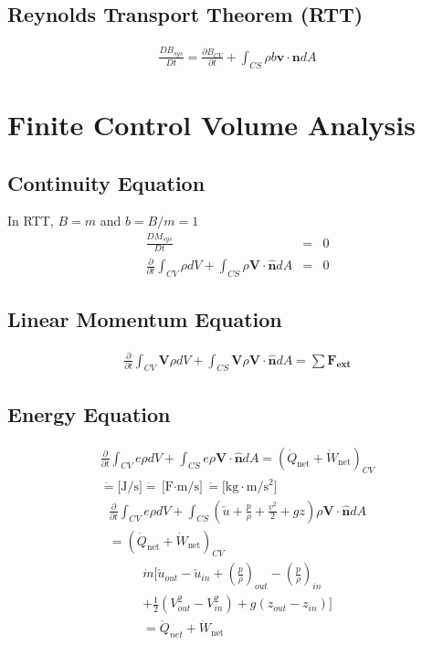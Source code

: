 \documentclass[a4paper]{amsart}
\begin{document}
\subsection{Reynolds Transport Theorem (RTT)}
\begin{eqnarray*}
	\frac{D B_{sys}}{Dt}=\frac{\partial B_{CV}}{\partial t}+\int_{CS}\rho b \mathbf{v}\cdot\mathbf{n}dA
\end{eqnarray*}

\section{Finite Control Volume Analysis}
\subsection{Continuity Equation}
In RTT, $B=m$ and $b=B/m=1$
\begin{eqnarray*}
	\frac{D M_{sys}}{Dt}&=&0\\
	\frac{\partial}{\partial t}\int_{CV}\rho dV+\int_{CS}\rho \mathbf{V}\cdot \mathbf{\hat n}dA&=&0
\end{eqnarray*}

\subsection{Linear Momentum Equation}
\begin{eqnarray*}
	\frac{\partial}{\partial t}\int_{CV}\mathbf{V}\rho dV+\int_{CS}\mathbf{V}\rho \mathbf{V}\cdot \mathbf{\hat n}dA=\sum \mathbf{F_{\text{ext}}}
\end{eqnarray*}


\subsection{Energy Equation}
\begin{eqnarray*}
	\frac{\partial}{\partial t}\int_{CV}e\rho dV
	+
	\int_{CS}e\rho \mathbf{V}\cdot \mathbf{\hat n}dA
	=
	\left(\dot Q_{\text{net}}+\dot W_{\text{net}}\right)_{CV}
	\\\dot =\text{[J/s]}\dot =\text{[F$\cdot$m/s]}\dot =\text{[kg$\cdot$m/s$^2$]}
\end{eqnarray*}
\begin{eqnarray*}
	\frac{\partial}{\partial t}\int_{CV}e\rho dV
	+
	\int_{CS}\left(\check u+\frac{p}{\rho}+\frac{v^2}{2}+gz\right)\rho \mathbf{V}\cdot \mathbf{\hat n}dA
	\\
	=
	\left(\dot Q_{\text{net}}+\dot W_{\text{net}}\right)_{CV}
\end{eqnarray*}
\begin{eqnarray*}
	\dot m
	[
		\check u_{out}
		-\check u_{in}
		+
			\left(\frac{p}{\rho}\right)_{out}
		-	
			\left(\frac{p}{\rho}\right)_{in}\\
		+
			\frac{1}{2}
				\left(V_{out}^2-V_{in}^2\right)
		+
			g(z_{out}-z_{in})
	]
	\\
	=\dot Q_{net}+\dot W_{\text{net}}
\end{eqnarray*}
\end{document}
